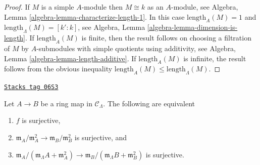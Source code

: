 \begin{proof}
If $M$ is a simple $A$-module then $M \cong k$ as an $A$-module, see
Algebra, Lemma \ref{algebra-lemma-characterize-length-1}.
In this case $\text{length}_A(M) = 1$ and
$\text{length}_\Lambda(M) = [k' : k]$, see
Algebra, Lemma \ref{algebra-lemma-dimension-is-length}.
If $\text{length}_A(M)$ is finite, then the result follows on
choosing a filtration of $M$ by $A$-submodules with simple quotients
using additivity, see
Algebra, Lemma \ref{algebra-lemma-length-additive}.
If $\text{length}_A(M)$ is infinite, the result follows from the obvious
inequality $\text{length}_A(M) \leq \text{length}_\Lambda(M)$.
\end{proof}

\begin{lemma}[Surjective]
\label{formal-defos-lemma-surjective}
\href{https://stacks.math.columbia.edu/tag/06S3}{\texttt{Stacks tag 06S3}}

Let $A \to B$ be a ring map in $\mathcal{C}_\Lambda$.
The following are equivalent
\begin{enumerate}
\item $f$ is surjective,
\item $\mathfrak m_A/\mathfrak m_A^2 \to \mathfrak m_B/\mathfrak m_B^2$
is surjective, and
\item $\mathfrak m_A/(\mathfrak m_\Lambda A + \mathfrak m_A^2)
\to \mathfrak m_B/(\mathfrak m_\Lambda B + \mathfrak m_B^2)$ is surjective.
\end{enumerate}
\end{lemma}

